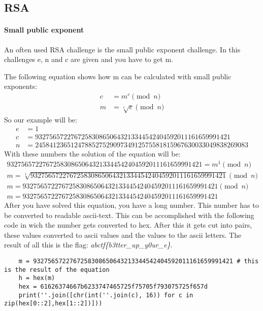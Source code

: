 \subsection{RSA}
 \paragraph{Small public exponent} An often used RSA challenge is the small public exponent challenge. In this challenges e, n and c are given and you have to get m. 

 The following equation shows how m can be calculated with small public exponents:
\begin{align}
c & = m^e \pmod{n} \\
m & = \sqrt[e]{c} \pmod{n}
\end{align}
So our example will be:
\begin{align*}
e&=1 \\
c&=9327565722767258308650643213344542404592011161659991421 \\
n&=245841236512478852752909734912575581815967630033049838269083
\end{align*}
With these numbers the solution of the equation will be:
\begin{align}
9327565722767258308650643213344542404592011161659991421 = m^1 \pmod{n} \\
m = \sqrt[1]{9327565722767258308650643213344542404592011161659991421} \pmod{n} \\
m = 9327565722767258308650643213344542404592011161659991421 \pmod{n} \\
m = 9327565722767258308650643213344542404592011161659991421
\end{align}
After you have solved this equation, you have a long number. This number has to be converted to readable ascii-text. This can be accomplished with the following code in wich the number gets converted to hex. After this it gets cut into pairs, these values converted to ascii values and the values to the ascii letters. The result of all this is the flag: \emph{abctf\{b3tter\_up\_y0ur\_e\}}.

\begin{lstlisting}
	m = 9327565722767258308650643213344542404592011161659991421 # this is the result of the equation
	h = hex(m)
	hex = 61626374667b6233747465725f75705f793075725f657d
	print(''.join([chr(int(''.join(c), 16)) for c in zip(hex[0::2],hex[1::2])]))
\end{lstlisting}